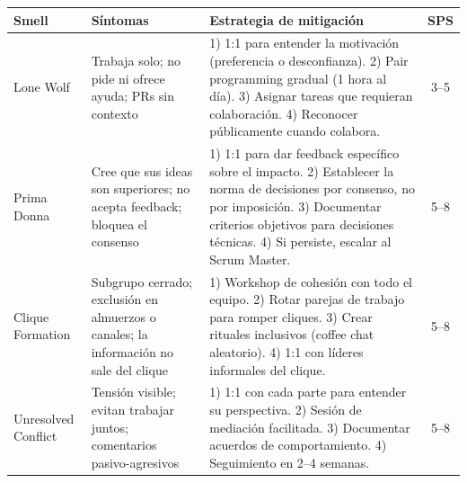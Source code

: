 \begin{table}[h]
    \centering
    \footnotesize
    \begin{tabularx}{\textwidth}{|l|X|X|c|}
        \hline
        \textbf{Smell} & \textbf{Síntomas}                                                                     & \textbf{Estrategia de mitigación} & \textbf{SPS} \\
        \hline
        Lone Wolf
                       & Trabaja solo; no pide ni ofrece ayuda; PRs sin contexto
                       & 1) 1:1 para entender la motivación (preferencia o desconfianza).
        2) Pair programming gradual (1 hora al día).
        3) Asignar tareas que requieran colaboración.
        4) Reconocer públicamente cuando colabora.
                       & 3--5                                                                                                                                     \\
        \hline
        Prima Donna
                       & Cree que sus ideas son superiores; no acepta feedback; bloquea el consenso
                       & 1) 1:1 para dar feedback específico sobre el impacto.
        2) Establecer la norma de decisiones por consenso, no por imposición.
        3) Documentar criterios objetivos para decisiones técnicas.
        4) Si persiste, escalar al Scrum Master.
                       & 5--8                                                                                                                                     \\
        \hline
        Clique Formation
                       & Subgrupo cerrado; exclusión en almuerzos o canales; la información no sale del clique
                       & 1) Workshop de cohesión con todo el equipo.
        2) Rotar parejas de trabajo para romper cliques.
        3) Crear rituales inclusivos (coffee chat aleatorio).
        4) 1:1 con líderes informales del clique.
                       & 5--8                                                                                                                                     \\
        \hline
        Unresolved Conflict
                       & Tensión visible; evitan trabajar juntos; comentarios pasivo-agresivos
                       & 1) 1:1 con cada parte para entender su perspectiva.
        2) Sesión de mediación facilitada.
        3) Documentar acuerdos de comportamiento.
        4) Seguimiento en 2--4 semanas.
                       & 5--8                                                                                                                                     \\

\end{tabularx}
\end{table}
